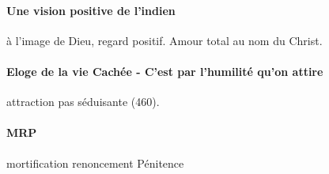 \paragraph{Une vision positive de l'indien} à l'image de Dieu, regard positif. Amour total au nom du Christ. 

\paragraph{Eloge de la vie Cachée - C'est par l'humilité qu'on attire} attraction pas séduisante (460). 

\paragraph{MRP} mortification renoncement Pénitence